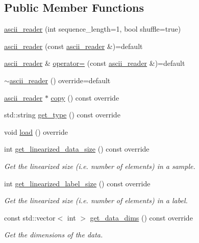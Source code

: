 \subsection*{Public Member Functions}
\begin{DoxyCompactItemize}
\item 
\hyperlink{classlbann_1_1ascii__reader_a5a7b563d58c20eeffad4e5e2a96734bb}{ascii\+\_\+reader} (int sequence\+\_\+length=1, bool shuffle=true)
\item 
\hyperlink{classlbann_1_1ascii__reader_ae2b30b72049490b5e9cf868ad400692a}{ascii\+\_\+reader} (const \hyperlink{classlbann_1_1ascii__reader}{ascii\+\_\+reader} \&)=default
\item 
\hyperlink{classlbann_1_1ascii__reader}{ascii\+\_\+reader} \& \hyperlink{classlbann_1_1ascii__reader_a83acb780b4d43302bef4324a9d307749}{operator=} (const \hyperlink{classlbann_1_1ascii__reader}{ascii\+\_\+reader} \&)=default
\item 
\hyperlink{classlbann_1_1ascii__reader_a7f974a0e609047e1a5d1df194d33a79d}{$\sim$ascii\+\_\+reader} () override=default
\item 
\hyperlink{classlbann_1_1ascii__reader}{ascii\+\_\+reader} $\ast$ \hyperlink{classlbann_1_1ascii__reader_a36b96f897e437bcd5886a052abdd9b64}{copy} () const override
\item 
std\+::string \hyperlink{classlbann_1_1ascii__reader_aee041430b7ef13c8324393568fa89922}{get\+\_\+type} () const override
\item 
void \hyperlink{classlbann_1_1ascii__reader_a678254a9d1c90459a1502d63e36a2b61}{load} () override
\item 
int \hyperlink{classlbann_1_1ascii__reader_adbbcd2eba6b3e0c985dcfaa24cb78aa0}{get\+\_\+linearized\+\_\+data\+\_\+size} () const override
\begin{DoxyCompactList}\small\item\em Get the linearized size (i.\+e. number of elements) in a sample. \end{DoxyCompactList}\item 
int \hyperlink{classlbann_1_1ascii__reader_aa997a38db111d3a8a9a0e08169ac9cc3}{get\+\_\+linearized\+\_\+label\+\_\+size} () const override
\begin{DoxyCompactList}\small\item\em Get the linearized size (i.\+e. number of elements) in a label. \end{DoxyCompactList}\item 
const std\+::vector$<$ int $>$ \hyperlink{classlbann_1_1ascii__reader_afcd9c809960f236996e7838a995c0edd}{get\+\_\+data\+\_\+dims} () const override
\begin{DoxyCompactList}\small\item\em Get the dimensions of the data. \end{DoxyCompactList}\end{DoxyCompactItemize}
